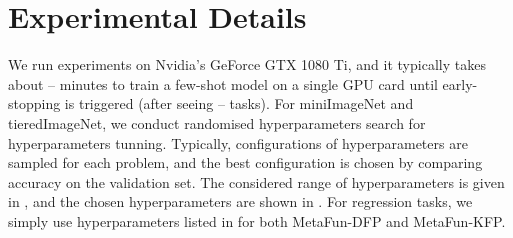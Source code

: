 \documentclass{article}
\theoremstyle{definition}
\begin{document}
\section{Experimental Details} \label{sec:experimental-details}

We run experiments on Nvidia's GeForce GTX 1080 Ti, and it typically takes about -- minutes to train a few-shot model on a single GPU card until early-stopping is triggered (after seeing -- tasks).
For miniImageNet and tieredImageNet, we conduct randomised hyperparameters search \citep{bergstra2012random} for hyperparameters tunning. Typically,  configurations of hyperparameters are sampled for each problem, and the best configuration is chosen by comparing accuracy on the validation set. The considered range of hyperparameters is given in , and the chosen hyperparameters are shown in . For regression tasks, we simply use hyperparameters listed in  for both MetaFun-DFP and MetaFun-KFP.
\end{document}
